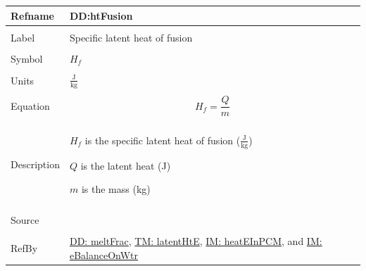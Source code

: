 \documentclass[12pt]{article}
\begin{document}
\noindent \begin{minipage}{\textwidth}
\begin{tabular}{>{\raggedright}p{}>{\raggedright\arraybackslash}p{}}
\toprule \textbf{Refname} & \textbf{DD:htFusion}
\label{DD:htFusion}
\\ \midrule \\
Label & Specific latent heat of fusion
\\ \midrule \\
Symbol & ${H_{f}}$
\\ \midrule \\
Units & $\frac{\text{J}}{\text{kg}}$
\\ \midrule \\
Equation & \begin{displaymath}
           {H_{f}}=\frac{Q}{m}
           \end{displaymath}
\\ \midrule \\
Description & \begin{symbDescription}
              \item{${H_{f}}$ is the specific latent heat of fusion ($\frac{\text{J}}{\text{kg}}$)}
              \item{$Q$ is the latent heat (J)}
              \item{$m$ is the mass (kg)}
              \end{symbDescription}
\\ \midrule \\
Source & \cite[(pg. 282)]{bueche1986}
\\ \midrule \\
RefBy & \hyperref[DD:meltFrac]{DD: meltFrac}, \hyperref[TM:latentHtE]{TM: latentHtE}, \hyperref[IM:heatEInPCM]{IM: heatEInPCM}, and \hyperref[IM:eBalanceOnWtr]{IM: eBalanceOnWtr}
\\ \bottomrule
\end{tabular}
\end{minipage}
\par~
\end{document}
